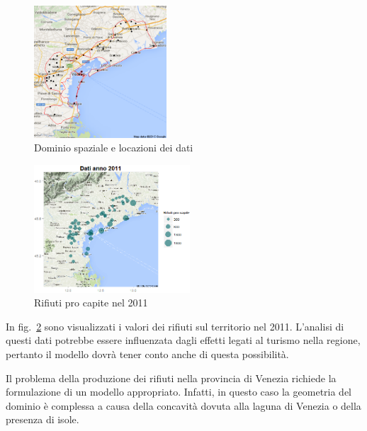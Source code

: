 \documentclass[a4paper,11pt,twoside,openright]{book}							%
\begin{document}
\begin{figure}[h]
	\centering
	\includegraphics[width=0.44\textwidth]{Immagini/Ven_punti.png}   
   	\caption{Dominio spaziale e locazioni dei dati}
	\label{fig:intro}
\end{figure}
\newpage
\begin{figure}[t]
	\centering
	\includegraphics[width=0.52\textwidth]{Immagini/venezia_dati/Dati2011.png}
   \caption{Rifiuti pro capite nel 2011}
	\label{fig:intro2}
\end{figure}
In fig.~\ref{fig:intro2} sono visualizzati i valori dei rifiuti sul territorio nel 2011. L'analisi di questi dati potrebbe essere influenzata dagli effetti legati al turismo nella regione, pertanto il modello dovrà tener conto anche di questa possibilità.

Il problema della produzione dei rifiuti nella provincia di Venezia richiede la formulazione di un modello appropriato. Infatti, in questo caso la geometria del dominio è complessa a causa della concavità dovuta alla laguna di Venezia o della presenza di isole. 
\end{document}
